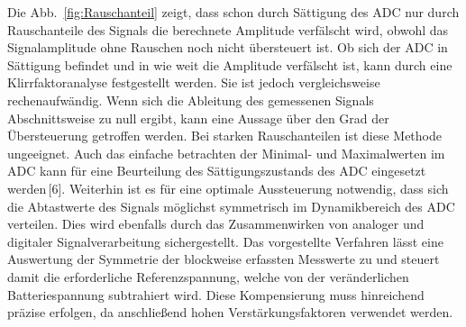 
Die Abb.~\ref{fig:Rauschanteil} zeigt, dass schon durch Sättigung des ADC nur durch Rauschanteile des Signals die berechnete Amplitude verfälscht wird, obwohl das Signalamplitude ohne Rauschen noch nicht übersteuert ist. Ob sich der ADC in Sättigung befindet und in wie weit die Amplitude verfälscht ist, kann durch eine Klirrfaktoranalyse festgestellt werden. Sie ist jedoch vergleichsweise rechenaufwändig.  
Wenn sich die Ableitung des gemessenen Signals Abschnittsweise zu null ergibt, kann eine Aussage über den Grad der Übersteuerung getroffen werden. Bei starken Rauschanteilen ist diese Methode ungeeignet. Auch das einfache betrachten der Minimal- und Maximalwerten im ADC kann für eine Beurteilung des Sättigungszustands des ADC eingesetzt werden\,[6].
Weiterhin ist es für eine optimale Aussteuerung notwendig, dass sich die Abtastwerte des Signals möglichst symmetrisch im Dynamikbereich des ADC verteilen. Dies wird ebenfalls durch das Zusammenwirken von analoger und digitaler Signalverarbeitung sichergestellt. Das vorgestellte Verfahren lässt eine Auswertung der Symmetrie der blockweise erfassten Messwerte zu und steuert damit die erforderliche Referenzspannung, welche von der veränderlichen Batteriespannung subtrahiert wird. 
Diese Kompensierung muss hinreichend präzise erfolgen, da anschließend hohen Verstärkungsfaktoren verwendet werden. 

